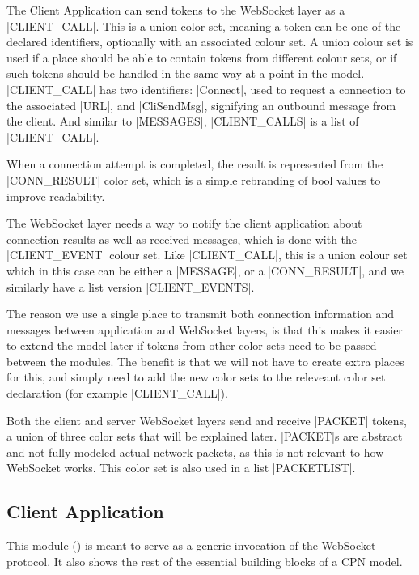 	The Client Application can send tokens to the WebSocket layer as a
	|CLIENT_CALL|. This is a union color set, meaning a token can be one of the
	declared identifiers, optionally with an associated colour set. A union colour set is used if a place should be
	able to contain tokens from different colour sets, or if such tokens should be
	handled in the same way at a point in the model. |CLIENT_CALL|
	has two identifiers: |Connect|, used to request a connection to the
	associated |URL|, and |CliSendMsg|, signifying an outbound message from the
	client. And similar to |MESSAGES|, |CLIENT_CALLS| is a list of |CLIENT_CALL|.
	
	When a connection attempt is completed, the result is represented from the
	|CONN_RESULT| color set, which is a simple rebranding of bool values to improve
	readability.
	
	The WebSocket layer needs a way to notify the client application about 
	connection results as well as received messages, which is done with the
	|CLIENT_EVENT| colour set. Like |CLIENT_CALL|, this is a union colour set which
	in this case can be either a |MESSAGE|, or a |CONN_RESULT|, and we similarly
	have a list version |CLIENT_EVENTS|.
	
	The reason we use a single place to transmit both connection information and
	messages between application and WebSocket layers, is that this makes it easier
	to extend the model later if tokens from other color sets need to be passed
	between the modules. The benefit is that we will not have to create extra places for
	this, and simply need to add the new color sets to the releveant color set
	declaration (for example |CLIENT_CALL|).
	
	Both the client and server WebSocket layers send and receive
	|PACKET| tokens, a union of three color sets that will be explained later.
	|PACKET|s are abstract and not fully modeled actual network packets, as this is
	not relevant to how WebSocket works. This color set is also used in a list 
	|PACKETLIST|.
	

\subsection{Client Application}

	
	This module () is meant to serve as a generic invocation of
	the WebSocket protocol. It also shows the rest of the essential building blocks
	of a CPN model.
	

